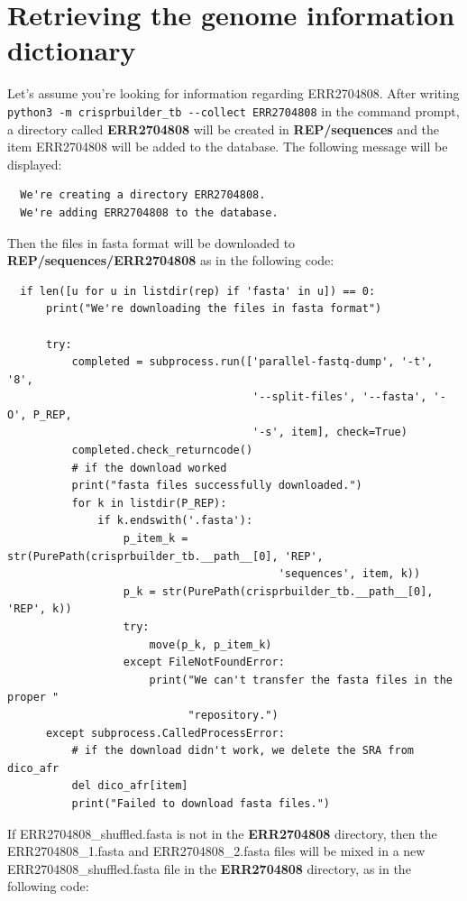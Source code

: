 \documentclass[twoside,a4paper,11pt,frenchb,openany]{report}
\begin{document}
    \section{Retrieving the genome information
dictionary}\label{retrieving-the-genome-information-dictionary}

    Let's assume you're looking for information regarding ERR2704808. After
writing \texttt{python3\ -m\ crisprbuilder\_tb\ -\/-collect\ ERR2704808}
in the command prompt, a directory called \textbf{ERR2704808} will be
created in \textbf{REP/sequences} and the item ERR2704808 will be added
to the database. The following message will be displayed:

    \begin{verbatim}
  We're creating a directory ERR2704808.
  We're adding ERR2704808 to the database.
\end{verbatim}

    Then the files in fasta format will be downloaded to
\textbf{REP/sequences/ERR2704808} as in the following code:

\begin{verbatim}
  if len([u for u in listdir(rep) if 'fasta' in u]) == 0:
      print("We're downloading the files in fasta format")

      try:
          completed = subprocess.run(['parallel-fastq-dump', '-t', '8',
                                      '--split-files', '--fasta', '-O', P_REP,
                                      '-s', item], check=True)
          completed.check_returncode()
          # if the download worked
          print("fasta files successfully downloaded.")
          for k in listdir(P_REP):
              if k.endswith('.fasta'):
                  p_item_k = str(PurePath(crisprbuilder_tb.__path__[0], 'REP',
                                          'sequences', item, k))
                  p_k = str(PurePath(crisprbuilder_tb.__path__[0], 'REP', k))
                  try:
                      move(p_k, p_item_k)
                  except FileNotFoundError:
                      print("We can't transfer the fasta files in the proper "
                            "repository.")
      except subprocess.CalledProcessError:
          # if the download didn't work, we delete the SRA from dico_afr
          del dico_afr[item]
          print("Failed to download fasta files.")
\end{verbatim}

    If ERR2704808\_shuffled.fasta is not in the \textbf{ERR2704808}
directory, then the ERR2704808\_1.fasta and ERR2704808\_2.fasta files
will be mixed in a new ERR2704808\_shuffled.fasta file in the
\textbf{ERR2704808} directory, as in the following code:
\end{document}

